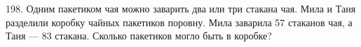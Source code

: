 198. Одним пакетиком чая можно заварить два или три стакана чая. Мила и Таня разделили коробку чайных пакетиков поровну. Мила заварила 57 стаканов чая, а Таня --- 83 стакана. Сколько пакетиков могло быть в коробке?\\
